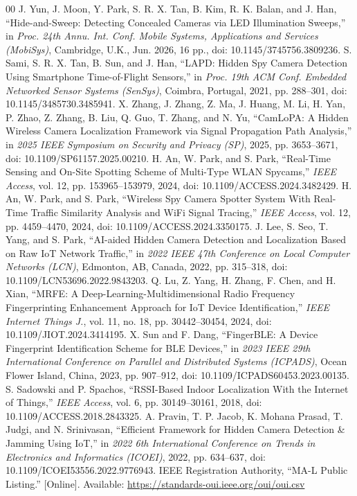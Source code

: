 \documentclass[conference]{IEEEtran}
\begin{document}
\begin{thebibliography}{00}
 J. Yun, J. Moon, Y. Park, S. R. X. Tan, B. Kim, R. K. Balan, and J. Han, ``Hide-and-Sweep: Detecting Concealed Cameras via LED Illumination Sweeps,'' in \emph{Proc. 24th Annu. Int. Conf. Mobile Systems, Applications and Services (MobiSys)}, Cambridge, U.K., Jun. 2026, 16 pp., doi: 10.1145/3745756.3809236.
 S. Sami, S. R. X. Tan, B. Sun, and J. Han, ``LAPD: Hidden Spy Camera Detection Using Smartphone Time-of-Flight Sensors,'' in \emph{Proc. 19th ACM Conf. Embedded Networked Sensor Systems (SenSys)}, Coimbra, Portugal, 2021, pp. 288--301, doi: 10.1145/3485730.3485941.
 X. Zhang, J. Zhang, Z. Ma, J. Huang, M. Li, H. Yan, P. Zhao, Z. Zhang, B. Liu, Q. Guo, T. Zhang, and N. Yu, ``CamLoPA: A Hidden Wireless Camera Localization Framework via Signal Propagation Path Analysis,'' in \emph{2025 IEEE Symposium on Security and Privacy (SP)}, 2025, pp. 3653--3671, doi: 10.1109/SP61157.2025.00210.
 H. An, W. Park, and S. Park, ``Real-Time Sensing and On-Site Spotting Scheme of Multi-Type WLAN Spycams,'' \emph{IEEE Access}, vol. 12, pp. 153965--153979, 2024, doi: 10.1109/ACCESS.2024.3482429.
 H. An, W. Park, and S. Park, ``Wireless Spy Camera Spotter System With Real-Time Traffic Similarity Analysis and WiFi Signal Tracing,'' \emph{IEEE Access}, vol. 12, pp. 4459--4470, 2024, doi: 10.1109/ACCESS.2024.3350175.
 J. Lee, S. Seo, T. Yang, and S. Park, ``AI-aided Hidden Camera Detection and Localization Based on Raw IoT Network Traffic,'' in \emph{2022 IEEE 47th Conference on Local Computer Networks (LCN)}, Edmonton, AB, Canada, 2022, pp. 315--318, doi: 10.1109/LCN53696.2022.9843203.
 Q. Lu, Z. Yang, H. Zhang, F. Chen, and H. Xian, ``MRFE: A Deep-Learning-Multidimensional Radio Frequency Fingerprinting Enhancement Approach for IoT Device Identification,'' \emph{IEEE Internet Things J.}, vol. 11, no. 18, pp. 30442--30454, 2024, doi: 10.1109/JIOT.2024.3414195.
 X. Sun and F. Dang, ``FingerBLE: A Device Fingerprint Identification Scheme for BLE Devices,'' in \emph{2023 IEEE 29th International Conference on Parallel and Distributed Systems (ICPADS)}, Ocean Flower Island, China, 2023, pp. 907--912, doi: 10.1109/ICPADS60453.2023.00135.
 S. Sadowski and P. Spachos, ``RSSI-Based Indoor Localization With the Internet of Things,'' \emph{IEEE Access}, vol. 6, pp. 30149--30161, 2018, doi: 10.1109/ACCESS.2018.2843325.
 A. Pravin, T. P. Jacob, K. Mohana Prasad, T. Judgi, and N. Srinivasan, ``Efficient Framework for Hidden Camera Detection \& Jamming Using IoT,'' in \emph{2022 6th International Conference on Trends in Electronics and Informatics (ICOEI)}, 2022, pp. 634--637, doi: 10.1109/ICOEI53556.2022.9776943.
 IEEE Registration Authority, ``MA-L Public Listing.'' [Online]. Available: \url{https://standards-oui.ieee.org/oui/oui.csv}
\end{thebibliography}
\end{document}
